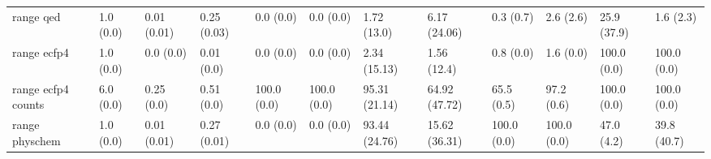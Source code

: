 \begin{tabular}{llllllllllll}
range qed & {\cellcolor[HTML]{EFF9FB}} \color[HTML]{000000} 1.0 (0.0) & {\cellcolor[HTML]{F6FCFD}} \color[HTML]{000000} 0.01 (0.01) & {\cellcolor[HTML]{CCECE6}} \color[HTML]{000000} 0.25 (0.03) & {\cellcolor[HTML]{F7FCFD}} \color[HTML]{000000} 0.0 (0.0) & {\cellcolor[HTML]{F7FCFD}} \color[HTML]{000000} 0.0 (0.0) & {\cellcolor[HTML]{F5FBFC}} \color[HTML]{000000} 1.72 (13.0) & {\cellcolor[HTML]{EFF9FB}} \color[HTML]{000000} 6.17 (24.06) & {\cellcolor[HTML]{F7FCFD}} \color[HTML]{000000} 0.3 (0.7) & {\cellcolor[HTML]{F4FBFC}} \color[HTML]{000000} 2.6 (2.6) & {\cellcolor[HTML]{C8EBE4}} \color[HTML]{000000} 25.9 (37.9) & {\cellcolor[HTML]{F5FBFC}} \color[HTML]{000000} 1.6 (2.3) \\
range ecfp4 & {\cellcolor[HTML]{EDF8FB}} \color[HTML]{000000} 1.0 (0.0) & {\cellcolor[HTML]{F7FCFD}} \color[HTML]{000000} 0.0 (0.0) & {\cellcolor[HTML]{F6FCFD}} \color[HTML]{000000} 0.01 (0.0) & {\cellcolor[HTML]{F7FCFD}} \color[HTML]{000000} 0.0 (0.0) & {\cellcolor[HTML]{F7FCFD}} \color[HTML]{000000} 0.0 (0.0) & {\cellcolor[HTML]{F4FBFC}} \color[HTML]{000000} 2.34 (15.13) & {\cellcolor[HTML]{F5FBFC}} \color[HTML]{000000} 1.56 (12.4) & {\cellcolor[HTML]{F6FCFD}} \color[HTML]{000000} 0.8 (0.0) & {\cellcolor[HTML]{F5FBFC}} \color[HTML]{000000} 1.6 (0.0) & {\cellcolor[HTML]{00441B}} \color[HTML]{F1F1F1} 100.0 (0.0) & {\cellcolor[HTML]{00441B}} \color[HTML]{F1F1F1} 100.0 (0.0) \\
range ecfp4 counts & {\cellcolor[HTML]{F6FCFD}} \color[HTML]{000000} 6.0 (0.0) & {\cellcolor[HTML]{F6FCFD}} \color[HTML]{000000} 0.25 (0.0) & {\cellcolor[HTML]{62C09F}} \color[HTML]{000000} 0.51 (0.0) & {\cellcolor[HTML]{00441B}} \color[HTML]{F1F1F1} 100.0 (0.0) & {\cellcolor[HTML]{00441B}} \color[HTML]{F1F1F1} 100.0 (0.0) & {\cellcolor[HTML]{005221}} \color[HTML]{F1F1F1} 95.31 (21.14) & {\cellcolor[HTML]{3BA76C}} \color[HTML]{F1F1F1} 64.92 (47.72) & {\cellcolor[HTML]{3AA66A}} \color[HTML]{F1F1F1} 65.5 (0.5) & {\cellcolor[HTML]{004D1F}} \color[HTML]{F1F1F1} 97.2 (0.6) & {\cellcolor[HTML]{00441B}} \color[HTML]{F1F1F1} 100.0 (0.0) & {\cellcolor[HTML]{00441B}} \color[HTML]{F1F1F1} 100.0 (0.0) \\
range physchem & {\cellcolor[HTML]{F6FCFD}} \color[HTML]{000000} 1.0 (0.0) & {\cellcolor[HTML]{F5FBFC}} \color[HTML]{000000} 0.01 (0.01) & {\cellcolor[HTML]{C5E9E2}} \color[HTML]{000000} 0.27 (0.01) & {\cellcolor[HTML]{F7FCFD}} \color[HTML]{000000} 0.0 (0.0) & {\cellcolor[HTML]{F7FCFD}} \color[HTML]{000000} 0.0 (0.0) & {\cellcolor[HTML]{005924}} \color[HTML]{F1F1F1} 93.44 (24.76) & {\cellcolor[HTML]{DFF3F4}} \color[HTML]{000000} 15.62 (36.31) & {\cellcolor[HTML]{00441B}} \color[HTML]{F1F1F1} 100.0 (0.0) & {\cellcolor[HTML]{00441B}} \color[HTML]{F1F1F1} 100.0 (0.0) & {\cellcolor[HTML]{72C7AD}} \color[HTML]{000000} 47.0 (4.2) & {\cellcolor[HTML]{8FD4C2}} \color[HTML]{000000} 39.8 (40.7) \\

\end{tabular}
